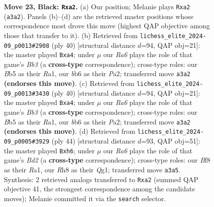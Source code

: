 \documentclass[11pt]{article}
\begin{document}
\begin{figure}[p]
\caption{\textbf{Move 23, Black: \texttt{Rxa2}.} (a) Our position; Melanie plays \texttt{Rxa2} (\texttt{a3a2}). Panels (b)--(d) are the retrieved master positions whose correspondence most drove this move (highest QAP objective among those that transfer to it). (b) Retrieved from \texttt{lichess\_elite\_2024-09\_p0013\#2908} (ply 40) [structural distance $d$=94, QAP obj=21]: the master played \texttt{Bxa4}; under $\mu$ our \emph{Ra6} plays the role of that game's \emph{Bb3} (a \textbf{cross-type} correspondence); cross-type roles: our \emph{B}b5 as their \emph{R}a1, our \emph{b}b6 as their \emph{P}a2; transferred move \texttt{a3a2} \textbf{(endorses this move)}. (c) Retrieved from \texttt{lichess\_elite\_2024-09\_p0013\#3430} (ply 40) [structural distance $d$=94, QAP obj=21]: the master played \texttt{Bxa4}; under $\mu$ our \emph{Ra6} plays the role of that game's \emph{Bb3} (a \textbf{cross-type} correspondence); cross-type roles: our \emph{B}b5 as their \emph{R}a1, our \emph{b}b6 as their \emph{P}a2; transferred move \texttt{a3a2} \textbf{(endorses this move)}. (d) Retrieved from \texttt{lichess\_elite\_2024-09\_p0005\#3929} (ply 44) [structural distance $d$=93, QAP obj=51]: the master played \texttt{Bxh6}; under $\mu$ our \emph{Ra6} plays the role of that game's \emph{Bd2} (a \textbf{cross-type} correspondence); cross-type roles: our \emph{B}f8 as their \emph{R}a1, our \emph{R}h8 as their \emph{Q}g1; transferred move \texttt{a3a5}. Synthesis: 2 retrieved analogs transferred to \texttt{Rxa2} (summed QAP objective 41, the strongest correspondence among the candidate moves); Melanie committed it via the \texttt{search} selector.}
\label{fig:thought-m45}
\end{figure}

\clearpage
\end{document}
